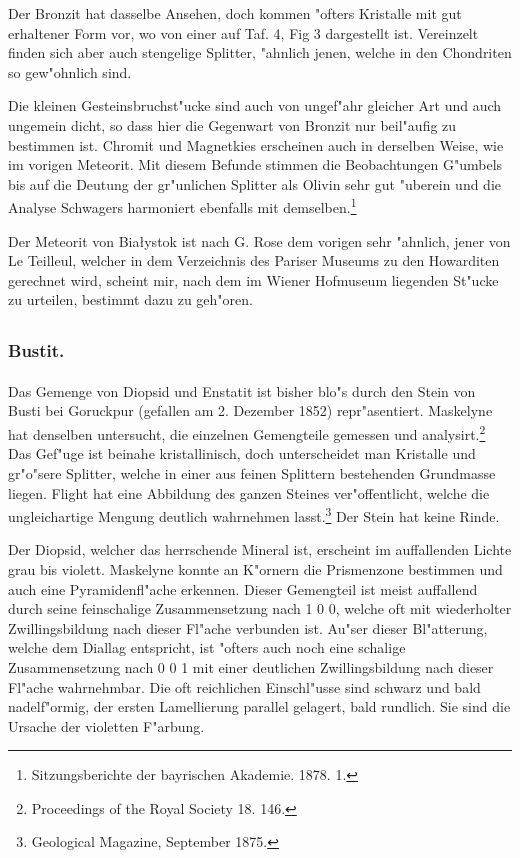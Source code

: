 \documentclass[a4paper, 11pt, oneside, polutonikogreek, german]{article}
\begin{document}
Der Bronzit hat dasselbe Ansehen, doch kommen "ofters Kristalle mit gut erhaltener Form vor, wo von einer auf Taf. 4, Fig 3 dargestellt ist. Vereinzelt finden sich aber auch stengelige Splitter, "ahnlich jenen, welche in den Chondriten so gew"ohnlich sind.

Die kleinen Gesteinsbruchst"ucke sind auch von ungef"ahr gleicher Art und auch ungemein dicht, so dass hier die Gegenwart von Bronzit nur beil"aufig zu bestimmen ist. Chromit und Magnetkies erscheinen auch in derselben Weise, wie im vorigen Meteorit. Mit diesem Befunde stimmen die Beobachtungen G"umbels bis auf die Deutung der gr"unlichen Splitter als Olivin sehr gut "uberein und die Analyse Schwagers harmoniert ebenfalls mit demselben.\footnote{Sitzungsberichte der bayrischen Akademie. 1878. 1.}

Der Meteorit von Białystok ist nach G. Rose dem vorigen sehr "ahnlich, jener von Le Teilleul, welcher in dem Verzeichnis des Pariser Museums zu den Howarditen gerechnet wird, scheint mir, nach dem im Wiener Hofmuseum liegenden St"ucke zu urteilen, bestimmt dazu zu geh"oren.
\clearpage
\subsection{}
\subsubsection{Bustit.}
\paragraph{}
Das Gemenge von Diopsid und Enstatit ist bisher blo"s durch den Stein von Busti bei Goruckpur (gefallen am 2. Dezember 1852) repr"asentiert. Maskelyne hat denselben untersucht, die einzelnen Gemengteile gemessen und analysirt.\footnote{Proceedings of the Royal Society 18. 146.} Das Gef"uge ist beinahe kristallinisch, doch unterscheidet man Kristalle und gr"o"sere Splitter, welche in einer aus feinen Splittern bestehenden Grundmasse liegen. Flight hat eine Abbildung des ganzen Steines ver"offentlicht, welche die ungleichartige Mengung deutlich wahrnehmen lasst.\footnote{Geological Magazine, September 1875.} Der Stein hat keine Rinde.

Der Diopsid, welcher das herrschende Mineral ist, erscheint im auffallenden Lichte grau bis violett. Maskelyne konnte an K"ornern die Prismenzone bestimmen und auch eine Pyramidenfl"ache erkennen. Dieser Gemengteil ist meist auffallend durch seine feinschalige Zusammensetzung nach 1 0 0, welche oft mit wiederholter Zwillingsbildung nach dieser Fl"ache verbunden ist. Au"ser dieser Bl"atterung, welche dem Diallag entspricht, ist "ofters auch noch eine schalige Zusammensetzung nach 0 0 1 mit einer deutlichen Zwillingsbildung nach dieser Fl"ache wahrnehmbar. Die oft reichlichen Einschl"usse sind schwarz und bald nadelf"ormig, der ersten Lamellierung parallel gelagert, bald rundlich. Sie sind die Ursache der violetten F"arbung.
\end{document}
